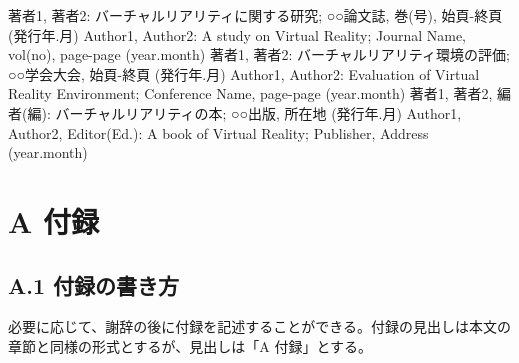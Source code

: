 \documentclass[a4paper,twoside]{jarticle}
\begin{document}
\begin{thebibliography}{99}
著者1, 著者2: バーチャルリアリティに関する研究; ○○論文誌, 巻(号), 
始頁-終頁 (発行年.月)
Author1, Author2: A study on Virtual Reality; Journal Name, vol(no), 
page-page (year.month)
著者1, 著者2: バーチャルリアリティ環境の評価; ○○学会大会, 始頁-終頁 
(発行年.月)
Author1, Author2: Evaluation of Virtual Reality Environment;
Conference Name, page-page (year.month)
著者1, 著者2, 編者(編): バーチャルリアリティの本; ○○出版, 所在地 (発行年.月)
Author1, Author2, Editor(Ed.): A book of Virtual Reality; Publisher, Address (year.month)
\end{thebibliography}

\newpage

\section*{A 付録}
\subsection*{A.1 付録の書き方}
必要に応じて、謝辞の後に付録を記述することができる。付録の見出しは本文の
章節と同様の形式とするが、見出しは「A 付録」とする。
\end{document}
